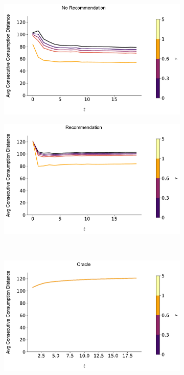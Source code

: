 \documentclass[format=acmsmall, review=true]{acmart}
\begin{document}
\begin{figure}[H]
\begin{subfigure}{.45\textwidth}
\includegraphics[width=\linewidth]{figures/gamma_consumption_dist_N_500T_20.pdf}
\end{subfigure}
\begin{subfigure}{.45\textwidth}
\includegraphics[width=\linewidth]{figures/gamma_consumption_dist_N_500T_20_partial.pdf}
\end{subfigure}\\
\begin{subfigure}{.45\textwidth}
\includegraphics[width=\linewidth]{figures/gamma_consumption_dist_N_500T_20_omni.pdf}\\

\end{subfigure}
\end{figure}
\end{document}
